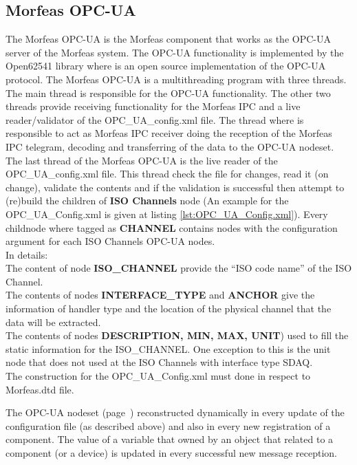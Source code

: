 \subsection{Morfeas OPC-UA}
The Morfeas OPC-UA is the Morfeas component that works as the OPC-UA server of the Morfeas system. The OPC-UA functionality is implemented by the Open62541 library where is an open source
implementation of the OPC-UA protocol. The Morfeas OPC-UA is a multithreading program with three threads. The main thread is responsible for the OPC-UA functionality. The other two threads provide
receiving functionality for the Morfeas IPC and a live reader/validator of the OPC\_UA\_config.xml file.
The thread where is responsible to act as Morfeas IPC receiver doing the reception of the Morfeas IPC telegram, decoding and transferring of the data to the OPC-UA nodeset.
The last thread of the Morfeas OPC-UA is the live reader of the OPC\_UA\_config.xml file. This thread check the file for changes, read it (on change), validate the contents and
if the validation is successful then attempt to (re)build the children of \textbf{ISO Channels} node (An example for the OPC\_UA\_Config.xml is given at listing \ref{lst:OPC_UA_Config.xml}).
Every childnode where tagged as \textbf{CHANNEL} contains nodes with the configuration argument for each ISO Channels OPC-UA nodes.\\

In details:\\
The content of node \textbf{ISO\_CHANNEL} provide the ``ISO code name'' of the ISO Channel.\\
The contents of nodes \textbf{INTERFACE\_TYPE} and \textbf{ANCHOR} give the information of handler type and the location of the physical channel that the data will be extracted.\\
The contents of nodes \textbf{DESCRIPTION, MIN, MAX, UNIT}) used to fill the static information for the ISO\_CHANNEL. One exception to this is the unit node that does not used
at the ISO Channels with interface type SDAQ.\\
The construction for the OPC\_UA\_Config.xml must done in respect to Morfeas.dtd file.

The OPC-UA nodeset (page~\pageref{tree:OPC_UA_nodeset}) reconstructed dynamically in every update of the configuration file (as described above) and also in every new registration of a component.
The value of a variable that owned by an object that related to a component (or a device) is updated in every successful new message reception.

